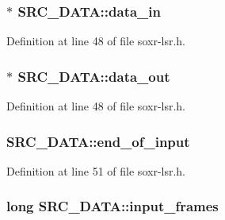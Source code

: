 \subsubsection[{\texorpdfstring{data\+\_\+in}{data_in}}]{$\ast$ S\+R\+C\+\_\+\+D\+A\+T\+A\+::data\+\_\+in}\hypertarget{struct_s_r_c___d_a_t_a_a000c251462ee769125402ccf83f448c2}{}\label{struct_s_r_c___d_a_t_a_a000c251462ee769125402ccf83f448c2}


Definition at line 48 of file soxr-\/lsr.\+h.

\subsubsection[{\texorpdfstring{data\+\_\+out}{data_out}}]{ $\ast$ S\+R\+C\+\_\+\+D\+A\+T\+A\+::data\+\_\+out}\hypertarget{struct_s_r_c___d_a_t_a_a0796632ae8924241a07ccf26bd749ed4}{}\label{struct_s_r_c___d_a_t_a_a0796632ae8924241a07ccf26bd749ed4}


Definition at line 48 of file soxr-\/lsr.\+h.

\subsubsection[{\texorpdfstring{end\+\_\+of\+\_\+input}{end_of_input}}]{ S\+R\+C\+\_\+\+D\+A\+T\+A\+::end\+\_\+of\+\_\+input}\hypertarget{struct_s_r_c___d_a_t_a_affc01ca4a99f3d15ab7c62da16b69eff}{}\label{struct_s_r_c___d_a_t_a_affc01ca4a99f3d15ab7c62da16b69eff}


Definition at line 51 of file soxr-\/lsr.\+h.

\subsubsection[{\texorpdfstring{input\+\_\+frames}{input_frames}}]{\setlength{\rightskip}{0pt plus 5cm}long S\+R\+C\+\_\+\+D\+A\+T\+A\+::input\+\_\+frames}\hypertarget{struct_s_r_c___d_a_t_a_a2b6fe0af73069250592190eece97a9ac}{}\label{struct_s_r_c___d_a_t_a_a2b6fe0af73069250592190eece97a9ac}



